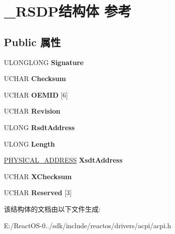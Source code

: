 \hypertarget{struct___r_s_d_p}{}\section{\+\_\+\+R\+S\+D\+P结构体 参考}
\label{struct___r_s_d_p}
\subsection*{Public 属性}
\begin{DoxyCompactItemize}
\item 
\mbox{\label{struct___r_s_d_p_a8c64d03949ed745eb7447696499c4bde}} 
U\+L\+O\+N\+G\+L\+O\+NG {\bfseries Signature}
\item 
\mbox{\label{struct___r_s_d_p_a9a37e4a893b594dd6b770a35c2a06759}} 
U\+C\+H\+AR {\bfseries Checksum}
\item 
\mbox{\label{struct___r_s_d_p_ac37dc2b6dfea7ebcfebe6805787460a1}} 
U\+C\+H\+AR {\bfseries O\+E\+M\+ID} \mbox{[}6\mbox{]}
\item 
\mbox{\label{struct___r_s_d_p_abe54539c6a0786a4711371528adce1d9}} 
U\+C\+H\+AR {\bfseries Revision}
\item 
\mbox{\label{struct___r_s_d_p_a06b3531ece97019a5f846824691aa981}} 
U\+L\+O\+NG {\bfseries Rsdt\+Address}
\item 
\mbox{\label{struct___r_s_d_p_a02424002571d868af368301dd124c34b}} 
U\+L\+O\+NG {\bfseries Length}
\item 
\mbox{\label{struct___r_s_d_p_abe43460013a5e126c62c34b6b54e6ec6}} 
\hyperlink{union___l_a_r_g_e___i_n_t_e_g_e_r}{P\+H\+Y\+S\+I\+C\+A\+L\+\_\+\+A\+D\+D\+R\+E\+SS} {\bfseries Xsdt\+Address}
\item 
\mbox{\label{struct___r_s_d_p_abcd294e26ec453db140b8e5ae9d655a4}} 
U\+C\+H\+AR {\bfseries X\+Checksum}
\item 
\mbox{\label{struct___r_s_d_p_a7fe7526f796086bc3488de77aaa13917}} 
U\+C\+H\+AR {\bfseries Reserved} \mbox{[}3\mbox{]}
\end{DoxyCompactItemize}


该结构体的文档由以下文件生成\+:\begin{DoxyCompactItemize}
\item 
E\+:/\+React\+O\+S-\/0../sdk/include/reactos/drivers/acpi/acpi.\+h\end{DoxyCompactItemize}
